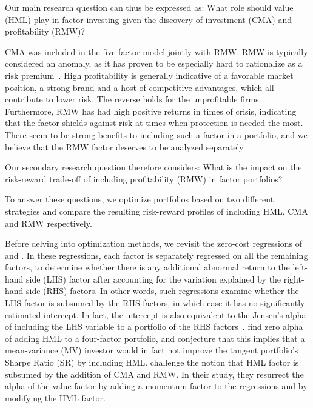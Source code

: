 Our main research question can thus be expressed as: What role should value (HML) play in factor investing given the discovery of investment (CMA) and profitability (RMW)?

CMA was included in the five-factor model jointly with RMW. RMW is typically considered an anomaly, as it has proven to be especially hard to rationalize as a risk premium~\autocite{Wang2013}. High profitability is generally indicative of a favorable market position, a strong brand and a host of competitive advantages, which all contribute to lower risk. The reverse holds for the unprofitable firms. Furthermore, RMW has had high positive returns in times of crisis, indicating that the factor shields against risk at times when protection is needed the most. There seem to be strong benefits to including such a factor in a portfolio, and we believe that the RMW factor deserves to be analyzed separately.

Our secondary research question therefore considers: What is the impact on the risk-reward trade-off of including profitability (RMW) in factor portfolios? 

To answer these questions, we optimize portfolios based on two different strategies and compare the resulting risk-reward profiles of including HML, CMA and RMW respectively.

Before delving into optimization methods, we revisit the zero-cost regressions of \textcite{FF2015} and \textcite{Asness2015}. In these regressions, each factor is separately regressed on all the remaining factors, to determine whether there is any additional abnormal return to the left-hand side (LHS) factor after accounting for the variation explained by the right-hand side (RHS) factors. In other words, such regressions examine whether the LHS factor is subsumed by the RHS factors, in which case it has no significantly estimated intercept. In fact, the intercept is also equivalent to the Jensen's alpha of including the LHS variable to a portfolio of the RHS factors~\autocite{Jensen1968}. \textcite{FF2015} find zero alpha of adding HML to a four-factor portfolio, and conjecture that this implies that a mean-variance (MV) investor would in fact not improve the tangent portfolio's Sharpe Ratio (SR) by including HML. \textcite{Asness2015} challenge the notion that HML factor is subsumed by the addition of CMA and RMW. In their study, they resurrect the alpha of the value factor by adding a momentum factor to the regressions and by modifying the HML factor.

